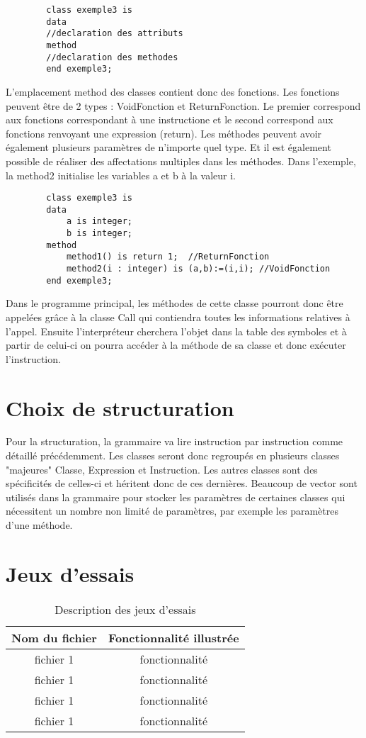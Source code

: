 \documentclass{report}
\begin{document}
	\begin{lstlisting}
		class exemple3 is
		data
		//declaration des attributs
		method
		//declaration des methodes
		end exemple3;
	\end{lstlisting}
	\par 
	L'emplacement method des classes contient donc des fonctions. Les fonctions peuvent être de 2 types : VoidFonction et ReturnFonction. Le premier correspond aux fonctions correspondant à une instructione et le second correspond aux fonctions renvoyant une expression (return). Les méthodes peuvent avoir également plusieurs paramètres de n'importe quel type. Et il est également possible de réaliser des affectations multiples dans les méthodes. Dans l'exemple, la method2 initialise les variables a et b à la valeur i.
	\begin{lstlisting}
		class exemple3 is
		data
			a is integer;
			b is integer;
		method
			method1() is return 1;	//ReturnFonction
			method2(i : integer) is (a,b):=(i,i); //VoidFonction
		end exemple3;
	\end{lstlisting}
	Dans le programme principal, les méthodes de cette classe pourront donc être appelées grâce à la classe Call qui contiendra toutes les informations relatives à l'appel. Ensuite l'interpréteur cherchera l'objet dans la table des symboles et à partir de celui-ci on pourra accéder à la méthode de sa classe et donc exécuter l'instruction.
	\section{Choix de structuration}
	Pour la structuration, la grammaire va lire instruction par instruction comme détaillé précédemment. Les classes seront donc regroupés en plusieurs classes "majeures" Classe, Expression et Instruction. Les autres classes sont des spécificités de celles-ci et héritent donc de ces dernières. Beaucoup de vector sont utilisés dans la grammaire pour stocker les paramètres de certaines classes qui nécessitent un nombre non limité de paramètres, par exemple les paramètres d'une méthode.
	\section{Jeux d'essais}
	\begin{table}[!h]
		\begin{center}
		\begin{tabular}{|c|c|}
			\hline
			\textbf{Nom du fichier} & \textbf{Fonctionnalité illustrée}\\
			\hline
			fichier 1 & fonctionnalité\\
			\hline
			fichier 1 & fonctionnalité\\
			\hline
			fichier 1 & fonctionnalité\\
			\hline
			fichier 1 & fonctionnalité\\
			\hline
		\end{tabular}
		\end{center}
		\caption{Description des jeux d'essais}
	\end{table}
\end{document}
